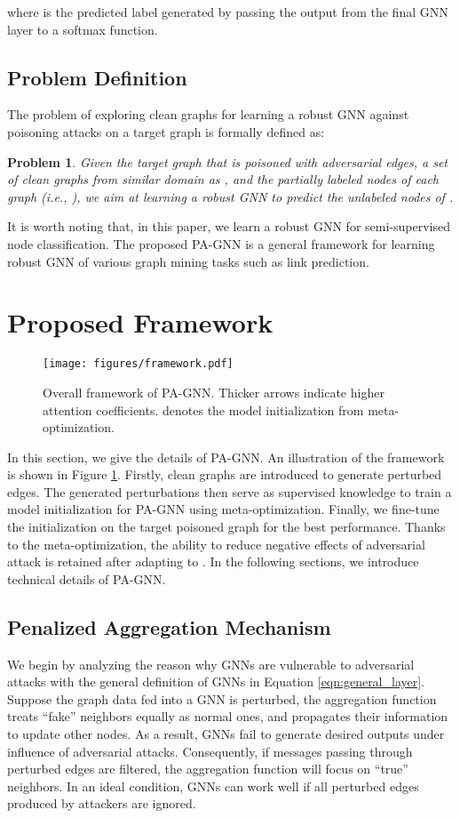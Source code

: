 \documentclass[sigconf]{acmart}
\newtheorem{mypro}{Problem}
\newcommand{\our}{{PA-GNN}\xspace}
\newcommand{\ours}{{PA-GNN}\xspace}
\begin{document}
where  is the predicted label generated by passing the output from the final GNN layer to a softmax function. 



\subsection{Problem Definition}
The problem of exploring clean graphs for learning a robust GNN against poisoning attacks on a target graph is formally defined as:
\begin{mypro}
\textit{Given the target graph  that is poisoned with adversarial edges, a set of clean graphs  from similar domain as , and the partially labeled nodes of each graph (i.e., ), we aim at learning a robust GNN to predict the unlabeled nodes of .}
\end{mypro}
It is worth noting that, in this paper, we learn a robust GNN for semi-supervised node classification. The proposed \our is a general framework for learning robust GNN of various graph mining tasks such as link prediction.
 \section{Proposed Framework}
\begin{figure}
    \centering
    \texttt{[image: figures/framework.pdf]}
\caption{Overall framework of \ours. Thicker arrows indicate higher attention coefficients.  denotes the model initialization from meta-optimization.}
    \label{fig:overall}
    \vspace{-2em}
\end{figure}
In this section, we give the details of \ours. An illustration of the framework is shown in Figure \ref{fig:overall}. Firstly, clean graphs  are introduced to generate perturbed edges. The generated perturbations then serve as supervised knowledge to train a model initialization for \ours using meta-optimization. Finally, we fine-tune the initialization on the target poisoned graph for the best performance. Thanks to the meta-optimization, the ability to reduce negative effects of adversarial attack is retained after adapting to . In the following sections, we introduce technical details of \ours.

\subsection{Penalized Aggregation Mechanism} \label{method:attn_penalty}
We begin by analyzing the reason why GNNs are vulnerable to adversarial attacks with the general definition of GNNs in Equation \ref{eqn:general_layer}.
Suppose the graph data fed into a GNN is perturbed, the aggregation function  treats ``fake'' neighbors equally as normal ones, and propagates their information to update other nodes. 
As a result, GNNs fail to generate desired outputs under influence of adversarial attacks.
Consequently, if messages passing through perturbed edges are filtered, the aggregation function will focus on ``true'' neighbors. In an ideal condition, GNNs can work well if all perturbed edges produced by attackers are ignored.
\end{document}
